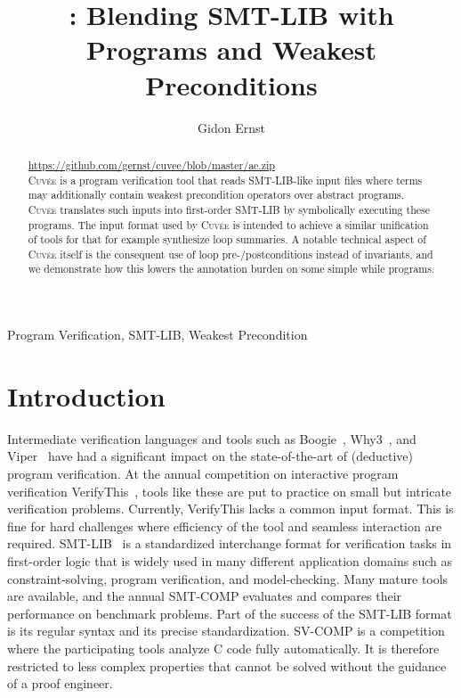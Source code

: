 \documentclass[fleqn]{llncs}
\title{\Cuvee: Blending SMT-LIB with \\ Programs and Weakest Preconditions}
\author{Gidon Ernst}
\institute{LMU Munich, Germany, \email{gidon.ernst@lmu.de}}
\newcommand{\Cuvee}{\textsc{Cuvée}\xspace}
\begin{document}
\maketitle

\begin{abstract}
\url{https://github.com/gernst/cuvee/blob/master/ae.zip}\\
\Cuvee is a program verification tool that reads SMT-LIB-like input files where terms may additionally contain weakest precondition operators over abstract programs.
\Cuvee translates such inputs into first-order SMT-LIB by symbolically executing these programs.
The input format used by \Cuvee is intended to achieve a similar unification of tools for that for example synthesize loop summaries.
A notable technical aspect of \Cuvee itself is the consequent use of loop pre-/postconditions instead of invariants, and we demonstrate how this lowers the annotation burden on some simple while programs.
\end{abstract}

\begin{keywords}
Program Verification, SMT-LIB, Weakest Precondition
\end{keywords}

\section{Introduction}

Intermediate verification languages and tools such as Boogie~\cite{leino2008boogie}, Why3~\cite{bobot2011why3}, and Viper~\cite{muller2016viper}
have had a significant impact on the state-of-the-art of (deductive) program verification.
At the annual competition on interactive program verification VerifyThis~\cite{ernst2019verifythis},
tools like these are put to practice on small but intricate verification problems.
Currently, VerifyThis lacks a common input format.
This is fine for hard challenges where efficiency of the tool and seamless interaction are required.
SMT-LIB~\cite{Barrett} is a standardized interchange format for verification tasks in first-order logic
that is widely used in many different application domains such as constraint-solving, program verification, and model-checking.
Many mature tools are available, and the annual SMT-COMP evaluates and compares their performance on benchmark problems.
Part of the success of the SMT-LIB format is its regular syntax and its precise standardization.
SV-COMP is a competition where the participating tools analyze C code fully automatically.
It is therefore restricted to less complex properties that cannot be solved without the guidance of a proof engineer.
\end{document}
